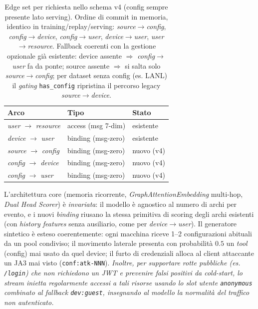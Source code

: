 \documentclass[11pt,a4paper]{report}
\begin{document}
\begin{table}[ht!]
\centering
\renewcommand{\arraystretch}{1.3}
\begin{tabular}{l l l}
\hline
\textbf{Arco} & \textbf{Tipo} & \textbf{Stato} \\
\hline
\textit{user} $\rightarrow$ \textit{resource}  & access (msg 7-dim) & esistente \\
\textit{device} $\rightarrow$ \textit{user}    & binding (msg-zero) & esistente \\
\textit{source} $\rightarrow$ \textit{config}  & binding (msg-zero) & nuovo (v4) \\
\textit{config} $\rightarrow$ \textit{device}  & binding (msg-zero) & nuovo (v4) \\
\textit{config} $\rightarrow$ \textit{user}    & binding (msg-zero) & nuovo (v4) \\
\hline
\end{tabular}
\caption{Edge set per richiesta nello schema v4 (config sempre presente lato serving). Ordine di commit in memoria, identico in training/replay/serving: \textit{source}$\rightarrow$\textit{config}, \textit{config}$\rightarrow$\textit{device}, \textit{config}$\rightarrow$\textit{user}, \textit{device}$\rightarrow$\textit{user}, \textit{user}$\rightarrow$\textit{resource}. Fallback coerenti con la gestione opzionale già esistente: device assente $\Rightarrow$ \textit{config}$\rightarrow$\textit{user} fa da ponte; source assente $\Rightarrow$ si salta solo \textit{source}$\rightarrow$\textit{config}; per dataset senza config (es. LANL) il \textit{gating} \texttt{has\_config} ripristina il percorso legacy \textit{source}$\rightarrow$\textit{device}.}
\label{tab:v4edges}
\end{table}

L'architettura core (memoria ricorrente, \textit{GraphAttentionEmbedding} multi-hop, \textit{Dual Head Scorer}) è \emph{invariata}: il modello è agnostico al numero di archi per evento, e i nuovi \textit{binding} riusano la stessa primitiva di scoring degli archi esistenti (con \textit{history features} senza ausiliario, come per \textit{device}$\rightarrow$\textit{user}). Il generatore sintetico è esteso coerentemente: ogni macchina riceve 1--2 configurazioni abituali da un pool condiviso; il movimento laterale presenta con probabilità $0.5$ un \emph{tool} (config) mai usato da quel device; il furto di credenziali alloca al client attaccante un JA3 mai visto (\texttt{conf:atk-NNN}). \emph{Inoltre, per supportare rotte pubbliche (es. \texttt{/login}) che non richiedono un JWT e prevenire falsi positivi da cold-start, lo stream inietta regolarmente accessi a tali risorse usando lo slot utente \texttt{anonymous} combinato al fallback \texttt{dev:guest}, insegnando al modello la normalità del traffico non autenticato.}
\end{document}
